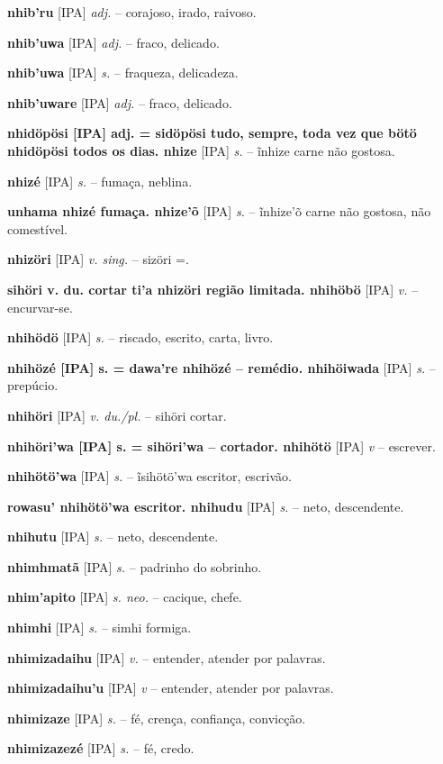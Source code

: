 \textbf{nhib'ru} [IPA] \textit{adj.} -- corajoso, irado, raivoso.

\textbf{nhib'uwa} [IPA] \textit{adj.} -- fraco, delicado.

\textbf{nhib'uwa} [IPA] \textit{s.} -- fraqueza, delicadeza.

\textbf{nhib'uware} [IPA] \textit{adj.} -- fraco, delicado.

\textbf{nhidöpösi [IPA] adj. = sidöpösi tudo, sempre, toda vez que  bötö nhidöpösi todos os dias. nhize} [IPA] \textit{s.} -- ĩnhize carne não gostosa.

\textbf{nhizé} [IPA] \textit{s.} -- fumaça, neblina.

\textbf{unhama nhizé fumaça. nhize'õ} [IPA] \textit{s.} -- ĩnhize'õ carne não gostosa, não comestível.

\textbf{nhizöri} [IPA] \textit{v. sing.} -- sizöri =.

\textbf{sihöri v. du. cortar  ti'a nhizöri região limitada. nhihöbö} [IPA] \textit{v.} -- encurvar-se.

\textbf{nhihödö} [IPA] \textit{s.} -- riscado, escrito, carta, livro.

\textbf{nhihözé [IPA] s. = dawa're nhihözé -- remédio. nhihöiwada} [IPA] \textit{s.} -- prepúcio.

\textbf{nhihöri} [IPA] \textit{v. du./pl.} -- sihöri cortar.

\textbf{nhihöri'wa [IPA] s. = sihöri'wa -- cortador. nhihötö} [IPA] \textit{v} -- escrever.

\textbf{nhihötö'wa} [IPA] \textit{s.} -- ĩsihötö'wa escritor, escrivão.

\textbf{rowasu' nhihötö'wa escritor. nhihudu} [IPA] \textit{s.} -- neto, descendente.

\textbf{nhihutu} [IPA] \textit{s.} -- neto, descendente.

\textbf{nhimhmatã} [IPA] \textit{s.} -- padrinho do sobrinho.

\textbf{nhim'apito} [IPA] \textit{s. neo.} -- cacique, chefe.

\textbf{nhimhi} [IPA] \textit{s.} -- simhi formiga.

\textbf{nhimizadaihu} [IPA] \textit{v.} -- entender, atender por palavras.

\textbf{nhimizadaihu'u} [IPA] \textit{v} -- entender, atender por palavras.

\textbf{nhimizaze} [IPA] \textit{s.} -- fé, crença, confiança, convicção.

\textbf{nhimizazezé} [IPA] \textit{s.} -- fé, credo.

